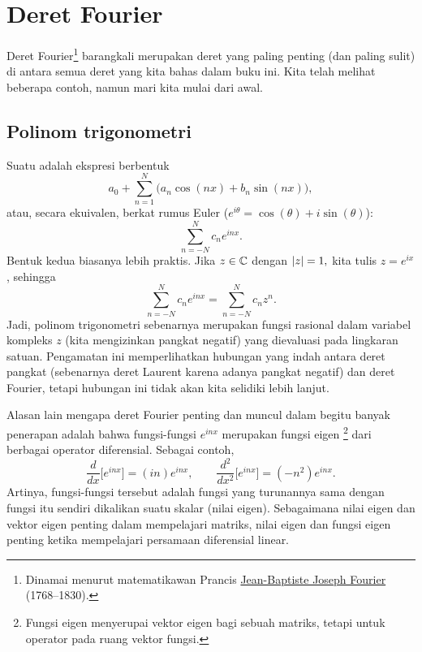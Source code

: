 
\sectionnewpage
\section{Deret Fourier}
\label{sec:fourier}



Deret Fourier\footnote{%
Dinamai menurut matematikawan Prancis
\href{https://en.wikipedia.org/wiki/Joseph_Fourier}{Jean-Baptiste Joseph Fourier}
(1768--1830).} barangkali merupakan deret yang paling penting (dan paling sulit)
di antara semua deret yang kita bahas dalam
buku ini.  Kita telah melihat beberapa contoh,
namun mari kita mulai
dari awal.

\subsection{Polinom trigonometri}

Suatu \emph{} adalah ekspresi berbentuk
\begin{equation*}
a_0 + \sum_{n=1}^N \bigl(a_n \cos(nx) + b_n \sin(nx) \bigr),
\end{equation*}
atau, secara ekuivalen, berkat rumus Euler ($e^{i\theta} = \cos(\theta) + i
\sin(\theta)$):
\begin{equation*}
\sum_{n=-N}^N c_n e^{inx} .
\end{equation*}
Bentuk kedua biasanya lebih praktis.  Jika
$z \in {\mathbb{C}}$ dengan $\lvert {z} \rvert=1,$ kita tulis $z = e^{ix}$, sehingga
\begin{equation*}
\sum_{n=-N}^N c_n e^{inx} = 
\sum_{n=-N}^N c_n z^n .
\end{equation*}
Jadi, polinom trigonometri sebenarnya merupakan fungsi rasional
dalam variabel kompleks $z$
(kita mengizinkan pangkat negatif) yang dievaluasi pada lingkaran satuan.
Pengamatan ini memperlihatkan hubungan yang indah antara deret pangkat
(sebenarnya deret Laurent karena adanya pangkat negatif) dan
deret Fourier,
tetapi hubungan ini tidak akan kita selidiki lebih lanjut.

\medskip

Alasan lain mengapa deret Fourier penting dan muncul dalam begitu banyak
penerapan adalah bahwa fungsi-fungsi $e^{inx}$ merupakan fungsi eigen%
\footnote{Fungsi eigen menyerupai vektor eigen bagi sebuah matriks, tetapi untuk
operator pada ruang vektor fungsi.} dari berbagai
operator diferensial.  Sebagai contoh,
\begin{equation*}
\frac{d}{dx} \bigl[ e^{inx} \bigr] = (in) e^{inx}, \qquad
\frac{d^2}{dx^2} \bigl[ e^{inx} \bigr] = (-n^2) e^{inx} .
\end{equation*}
Artinya, fungsi-fungsi tersebut adalah fungsi yang turunannya sama dengan
fungsi itu sendiri dikalikan suatu skalar (nilai eigen).
Sebagaimana nilai eigen dan vektor eigen penting dalam mempelajari matriks,
nilai eigen dan fungsi eigen penting ketika mempelajari persamaan
diferensial linear.

